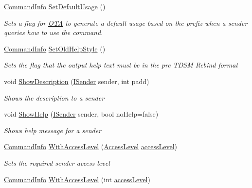 \begin{DoxyCompactItemize}
\hyperlink{classOTA_1_1Command_1_1CommandInfo}{Command\+Info} \hyperlink{classOTA_1_1Command_1_1CommandInfo_ae7a399893e2746abce6ee1e82fceed4b}{Set\+Default\+Usage} ()
\begin{DoxyCompactList}\small\item\em Sets a flag for \hyperlink{namespaceOTA}{O\+T\+A} to generate a default usage based on the prefix when a sender queries how to use the command. \end{DoxyCompactList}\item 
\hyperlink{classOTA_1_1Command_1_1CommandInfo}{Command\+Info} \hyperlink{classOTA_1_1Command_1_1CommandInfo_a8d15279570659a895752b61a18bf1003}{Set\+Old\+Help\+Style} ()
\begin{DoxyCompactList}\small\item\em Sets the flag that the output help text must be in the pre T\+D\+S\+M Rebind format \end{DoxyCompactList}\item 
void \hyperlink{classOTA_1_1Command_1_1CommandInfo_ad2857ed1f37516ea989c35dbbe60740f}{Show\+Description} (\hyperlink{interfaceOTA_1_1Command_1_1ISender}{I\+Sender} sender, int padd)
\begin{DoxyCompactList}\small\item\em Shows the description to a sender \end{DoxyCompactList}\item 
void \hyperlink{classOTA_1_1Command_1_1CommandInfo_a99ad5b1f7e7af8e344bfe6d3f629c533}{Show\+Help} (\hyperlink{interfaceOTA_1_1Command_1_1ISender}{I\+Sender} sender, bool no\+Help=false)
\begin{DoxyCompactList}\small\item\em Shows help message for a sender \end{DoxyCompactList}\item 
\hyperlink{classOTA_1_1Command_1_1CommandInfo}{Command\+Info} \hyperlink{classOTA_1_1Command_1_1CommandInfo_a1363e8d9675c5bcc3c95dcd7d3600d5c}{With\+Access\+Level} (\hyperlink{namespaceOTA_1_1Command_a0bb463ef02a9fd3406866a98c6fc2cdc}{Access\+Level} \hyperlink{classOTA_1_1Command_1_1CommandInfo_af68c80b3842e0ee78384be580308abe0}{access\+Level})
\begin{DoxyCompactList}\small\item\em Sets the required sender access level \end{DoxyCompactList}\item 
\hyperlink{classOTA_1_1Command_1_1CommandInfo}{Command\+Info} \hyperlink{classOTA_1_1Command_1_1CommandInfo_ae8352bf5a73e4b7b9dce204d6dd7d90e}{With\+Access\+Level} (int \hyperlink{classOTA_1_1Command_1_1CommandInfo_af68c80b3842e0ee78384be580308abe0}{access\+Level})

\end{DoxyCompactItemize}

